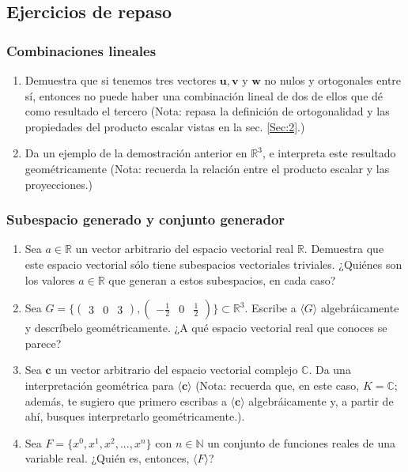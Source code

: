 \documentclass[12pt,dvipsnames]{article}
\begin{document}
\subsection{Ejercicios de repaso}

\subsubsection{Combinaciones lineales}

\begin{enumerate}
    \item Demuestra que si tenemos tres vectores $\mathbf{u}, \mathbf{v}$ y $\mathbf{w}$ no nulos y ortogonales entre sí, entonces no puede haber una combinación lineal de dos de ellos que dé como resultado el tercero (Nota: repasa la definición de ortogonalidad y las propiedades del producto escalar vistas en la sec. \ref{Sec:2}.) 
    \item Da un ejemplo de la demostración anterior en $\mathbb{R}^3$, e interpreta este resultado geométricamente (Nota: recuerda la relación entre el producto escalar y las proyecciones.) 
\end{enumerate}

\subsubsection{Subespacio generado y conjunto generador}

\begin{enumerate}
    \item Sea $a\in\mathbb{R}$ un vector arbitrario del espacio vectorial real $\mathbb{R}$. Demuestra que este espacio vectorial sólo tiene subespacios vectoriales triviales. ¿Quiénes son los valores $a\in\mathbb{R}$ que generan a estos subespacios, en cada caso? 
    \hypertarget{Ejer:3.4.2.2}{} \item Sea $G=\{\begin{pmatrix} 3 & 0 & 3 \end{pmatrix}, \begin{pmatrix} -\frac{1}{2} & 0 & \frac{1}{2} \end{pmatrix}\}\subset\mathbb{R}^3.$ Escribe a $\langle G \rangle$ algebráicamente y descríbelo geométricamente. ¿A qué espacio vectorial real que conoces se parece? 
    \item Sea $\mathbf{c}$ un vector arbitrario del espacio vectorial complejo $\mathbb{C}$. Da una interpretación geométrica para $\langle \mathbf{c} \rangle$ (Nota: recuerda que, en este caso, $K=\mathbb{C}$; además, te sugiero que primero escribas a $\langle \mathbf{c}\rangle$ algebráicamente y, a partir de ahí, busques interpretarlo geométricamente.). 
    \item Sea $F=\{x^0,x^1,x^2,...,x^n\}$ con $n\in\mathbb{N}$ un conjunto de funciones reales de una variable real. ¿Quién es, entonces, $\langle F \rangle$? 
\end{enumerate}
\end{document}
